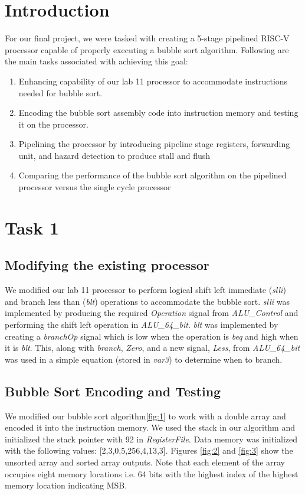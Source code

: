 \documentclass[12pt]{article}
\begin{document}
\newpage

\section{Introduction}
For our final project, we were tasked with creating a 5-stage pipelined RISC-V processor capable of properly executing a bubble sort algorithm. Following are the main tasks associated with achieving this goal:

\begin{enumerate}
    \item Enhancing capability of our lab 11 processor to accommodate instructions needed for bubble sort.
    \item Encoding the bubble sort assembly code into instruction memory and testing it on the processor.
    \item Pipelining the processor by introducing pipeline stage registers, forwarding unit, and hazard detection to produce stall and flush
    \item Comparing the performance of the bubble sort algorithm on the pipelined processor versus the single cycle processor
    
\end{enumerate}

\section{Task 1}
    \subsection{Modifying the existing processor}
        We modified our lab 11 processor to perform logical shift left immediate (\textit{slli}) and branch less than (\textit{blt}) operations to accommodate the bubble sort. \textit{slli} was implemented by producing the required \textit{Operation} signal from \textit{ALU\_Control} and performing the shift left operation in \textit{ALU\_64\_bit}. \textit{blt} was implemented by creating a \textit{branchOp} signal which is low when the operation is \textit{beq} and high when it is \textit{blt}. This, along with \textit{branch}, \textit{Zero}, and a new signal, \textit{Less}, from \textit{ALU\_64\_bit} was used in a simple equation (stored in \textit{var3}) to determine when to branch.
        
\newpage

    \subsection{Bubble Sort Encoding and Testing}
        We modified our bubble sort algorithm\ref{fig:1} to work with a double array and encoded it into the instruction memory. We used the stack in our algorithm and initialized the stack pointer with 92 in \textit{RegisterFile}. Data memory was initialized with the following values: [2,3,0,5,256,4,13,3]. Figures \ref{fig:2} and \ref{fig:3} show the unsorted array and sorted array outputs. Note that each element of the array occupies eight memory locations i.e. 64 bits with the highest index of the highest memory location indicating MSB.\\
        
\end{document}
